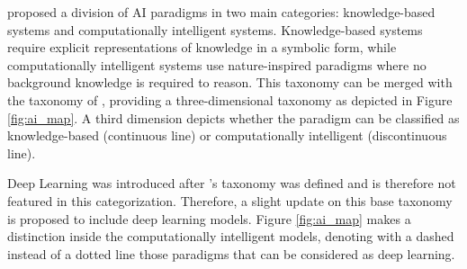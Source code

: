 \cite{hopgood_2009_knowledge-based} proposed a division of AI paradigms in two main categories: knowledge-based systems and computationally intelligent systems. Knowledge-based systems require explicit representations of knowledge in a symbolic form, while computationally intelligent systems use nature-inspired paradigms where no background knowledge is required to reason. This taxonomy can be merged with the taxonomy of \cite{corea_ai_2019}, providing a three-dimensional taxonomy as depicted in Figure \ref{fig:ai_map}. A third dimension depicts whether the paradigm can be classified as knowledge-based (continuous line) or computationally intelligent (discontinuous line). 

Deep Learning was introduced after \cite{hopgood_2009_knowledge-based}'s taxonomy was defined and is therefore not featured in this categorization. Therefore, a slight update on this base taxonomy is proposed to include deep learning models. Figure \ref{fig:ai_map} makes a distinction inside the computationally intelligent models, denoting with a dashed instead of a dotted line those paradigms that can be considered as deep learning. 

